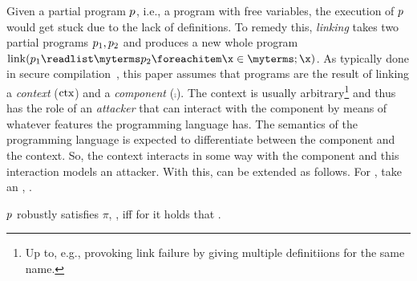 \documentclass[utf8,acmsmall,review,screen,dvipsnames]{acmart}
\begin{document}
Given a partial program $\progvar$, i.e., a program with free variables, the execution of $\progvar$ would get stuck due to the lack of definitions.
To remedy this, {\em linking} takes two partial programs $\progvar[_{1}],\progvar[_{2}]$ and produces a new whole program $\link{\progvar[_{1}]}{\progvar[_{2}]}$.
As typically done in secure compilation~\cite{abate2019jour},  this paper assumes that programs are the result of linking a {\em context} ($\ctx$) and a {\em component} ($\comp$).
The context is usually arbitrary\footnote{Up to, e.g., provoking link failure by giving multiple definitiions for the same name.} and thus has the role of an {\em attacker} that can interact with the component by means of whatever features the programming language has.
The semantics of the programming language is expected to differentiate between the component and the context.
So, the context interacts in some way with the component and this interaction models an attacker.
With this,  can be extended as follows.
For , take an , .

\begin{definition}\label{def:proprsat}
  $\progvar$ robustly satisfies $\pi$, \bul{$\rsat{\progvar}{\pi}$}, iff for  it holds that \oul{$\sat{\link{\contextvar}{\runtimetermvar}}{\pi}$}.
\end{definition}
\end{document}
